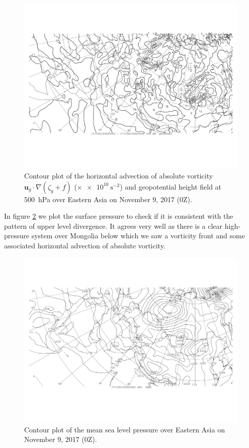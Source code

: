 \documentclass[11pt]{article}
\begin{document}
\begin{figure}[h!]
	\centering
	\includegraphics[width=\textwidth]{horizontal_advection_avor_500hPa_China}
	\caption{Contour plot of the horizontal advection of absolute vorticity $\bm{u}_g \cdot \nabla(\zeta_g + f)$ ($\times \SI{e10}{\s^{-2}}$) and geopotential height field at \SI{500}{\hecto\Pa} over Eastern Asia on November 9, 2017 (0Z).}
	\label{fig:horizontal_advection_avor_500hPa_China}
\end{figure}

In figure \ref{fig:pmsl_China} we plot the surface pressure to check if it is consistent with the pattern of upper level divergence. It agrees very well as there is a clear high-pressure system over Mongolia below which we saw a vorticity front and some associated horizontal advection of absolute vorticity.

\begin{figure}[h!]
	\centering
	\includegraphics[width=\textwidth]{pmsl_China}
	\caption{Contour plot of the mean sea level pressure over Eastern Asia on November 9, 2017 (0Z).}
	\label{fig:pmsl_China}
\end{figure}
\end{document}
